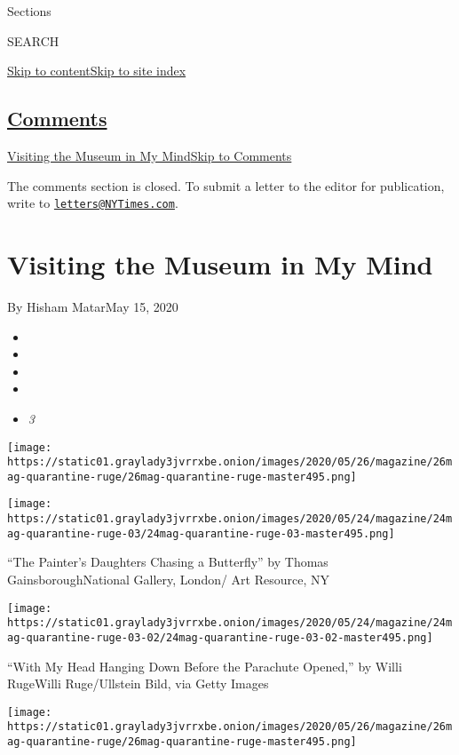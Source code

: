 Sections

SEARCH

\protect\hyperlink{site-content}{Skip to
content}\protect\hyperlink{site-index}{Skip to site index}

\hypertarget{comments}{%
\subsection{\texorpdfstring{\protect\hyperlink{commentsContainer}{Comments}}{Comments}}\label{comments}}

\href{}{Visiting the Museum in My Mind}\href{}{Skip to Comments}

The comments section is closed. To submit a letter to the editor for
publication, write to
\href{mailto:letters@NYTimes.com}{\nolinkurl{letters@NYTimes.com}}.

\hypertarget{visiting-the-museum-in-my-mind}{%
\section{Visiting the Museum in My
Mind}\label{visiting-the-museum-in-my-mind}}

By Hisham MatarMay 15, 2020

\begin{itemize}
\item
\item
\item
\item
\item
  \emph{3}
\end{itemize}

\texttt{[image: https://static01.graylady3jvrrxbe.onion/images/2020/05/26/magazine/26mag-quarantine-ruge/26mag-quarantine-ruge-master495.png]}

\texttt{[image: https://static01.graylady3jvrrxbe.onion/images/2020/05/24/magazine/24mag-quarantine-ruge-03/24mag-quarantine-ruge-03-master495.png]}

``The Painter's Daughters Chasing a Butterfly'' by Thomas
GainsboroughNational Gallery, London/ Art Resource, NY

\texttt{[image: https://static01.graylady3jvrrxbe.onion/images/2020/05/24/magazine/24mag-quarantine-ruge-03-02/24mag-quarantine-ruge-03-02-master495.png]}

``With My Head Hanging Down Before the Parachute Opened,'' by Willi
RugeWilli Ruge/Ullstein Bild, via Getty Images

\texttt{[image: https://static01.graylady3jvrrxbe.onion/images/2020/05/26/magazine/26mag-quarantine-ruge/26mag-quarantine-ruge-master495.png]}

